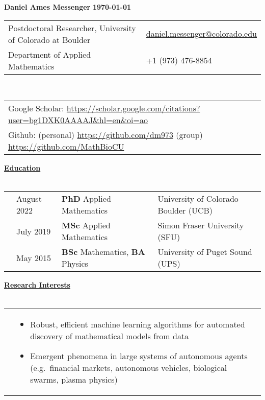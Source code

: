 \documentclass[letterpaper,11pt,oneside]{article}
\newcommand{\headr}[1]{\vspace{10pt}\uline{\Large{\textbf{#1}} \hfill } \\ \vspace{-10pt}\\}
\begin{document}
%
\noindent 
\LARGE{\textbf{Daniel Ames Messenger} \hspace{2in} \textbf{\monthyeardate\today}}   \\
\normalsize
%
%
\begin{center}
\begin{tabular}{l l}
 Postdoctoral Researcher, University of Colorado at Boulder & \hspace{0.5in} \href{mailto:daniel.messenger@colorado.edu}{daniel.messenger@colorado.edu} \\
Department of Applied Mathematics    & \hspace{1in}  +1 (973) 476-8854 \\
\end{tabular}\\ \vspace{0.5cm}
\begin{tabular}{l l}
Google Scholar: \url{https://scholar.google.com/citations?user=bg1DXK0AAAAJ&hl=en&oi=ao} & \\
Github: (personal) \url{https://github.com/dm973} \quad (group) \url{https://github.com/MathBioCU} &\\
\end{tabular}
\end{center}


\headr{Education}
 
\begin{tabular}{@{} p{0.01cm} p{4.2cm} p{5.5cm} p{8cm}}
& August 2022 & \textbf{PhD} Applied Mathematics & University of Colorado Boulder (UCB)\\ 
&July 2019 & \textbf{MSc} Applied Mathematics & Simon Fraser University (SFU)\\ 
&May 2015  & \textbf{BSc} Mathematics, \textbf{BA} Physics & University of Puget Sound (UPS)\\
\end{tabular}

\headr{Research Interests}
%
\begin{tabular}{@{} p{0.01cm} p{15cm}}
&\begin{itemize}
\item Robust, efficient machine learning algorithms for automated discovery of mathematical models from data
\item Emergent phenomena in large systems of autonomous agents (e.g.\ financial markets, autonomous vehicles, biological swarms, plasma physics) 
\end{itemize}
\end{tabular}
\end{document}
